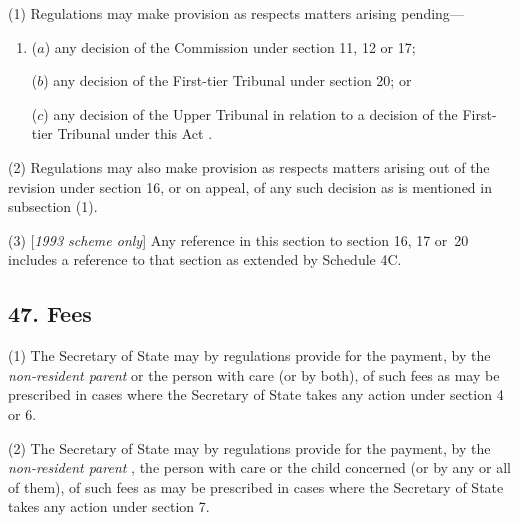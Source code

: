 \documentclass[12pt,a4paper]{article}
\begin{document}
(1) Regulations may make provision as respects matters arising pending—
\begin{enumerate}\item[]
($a$) any decision of the 
Commission  %
under section 11, 12 or 17;

($b$) any decision of 
the First-tier Tribunal  %
under section 20; or

($c$) any decision of 
the Upper Tribunal in relation to a decision of the First-tier Tribunal under this Act%
.
\end{enumerate}

(2) Regulations may also make provision as respects matters arising out of the revision under section 16, or on appeal, of any such decision as is mentioned in subsection (1).

(3) [\emph{1993 scheme only}] Any reference in this section to section 16, 17 or~20 includes a reference to that section as extended by Schedule 4C.


\subsection{47. Fees}

(1) The Secretary of State may by regulations provide for the payment, by the 
\emph{non-resident parent}  %
or the person with care (or by both), of such fees as may be prescribed in cases where the Secretary of State takes any action under section 4 or 6.

(2) The Secretary of State may by regulations provide for the payment, by the 
\emph{non-resident parent}%
, the person with care or the child concerned (or by any or all of them), of such fees as may be prescribed in cases where the Secretary of State takes any action under section 7.
\end{document}
